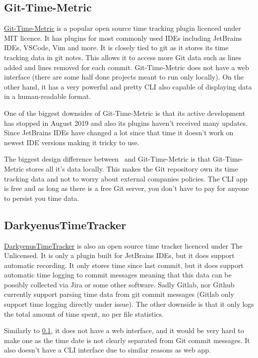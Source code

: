 \subsection{Git-Time-Metric}\label{subsec:git-time-metric}
\href{https://github.com/git-time-metric/gtm}{Git-Time-Metric} is a popular open source time tracking plugin licenced under MIT licence.
It has plugins for most commonly used IDEs including JetBrains IDEs, VSCode, Vim and more.
It is closely tied to git as it stores its time tracking data in git notes.
This allows it to access more Git data such as lines added and lines removed for each commit.
Git-Time-Metric does not have a web interface (there are some half done projects meant to run only locally).
On the other hand, it has a very powerful and pretty CLI also capable of displaying data in a human-readable format.

One of the biggest downsides of Git-Time-Metric is that its active development has stopped in August 2019 and also its plugins haven't received many updates.
Since JetBrains IDEs have changed a lot since that time it doesn't work on newest IDE versions making it tricky to use.

The biggest design difference between~ and Git-Time-Metric is that Git-Time-Metric stores all it's data locally.
This makes the Git repository own its time tracking data and not to worry about external companies policies.
The CLI app is free and as long as there is a free Git server, you don't have to pay for anyone to persist you time data.


\subsection{DarkyenusTimeTracker}\label{subsec:darkyenus-time-tracker}
\href{https://github.com/Darkyenus/DarkyenusTimeTracker}{DarkyenusTimeTracker} is also an open source time tracker licenced under The Unlicensed.
It is only a plugin built for JetBrains IDEs, but it does support automatic recording.
It only stores time since last commit, but it does support automatic time logging to commit messages meaning that this data can be possibly collected via Jira or some other software.
Sadly Gitlab, nor Github currently support parsing time data from git commit messages (Gitlab only support time logging directly under issue).
The other downside is that it only logs the total amount of time spent, no per file statistics.

Similarly to
\ref{subsec:git-time-metric}, it does not have a web interface, and it would be very hard to make one as the time date is not clearly separated from Git commit messages.
It also doesn't have a CLI interface due to similar reasons as web app.


